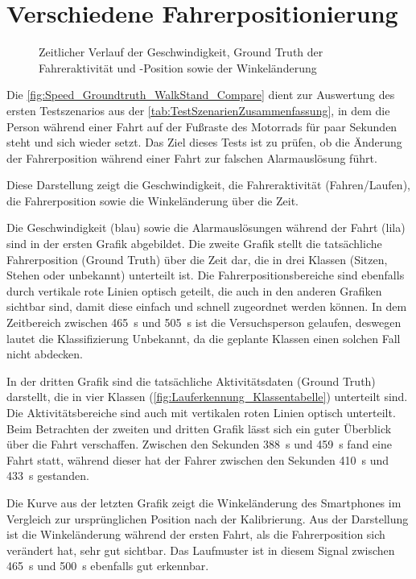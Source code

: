 \section{Verschiedene Fahrerpositionierung}
\begin{figure}[htpb]
	\centering
	\caption{Zeitlicher Verlauf der Geschwindigkeit, Ground Truth der Fahreraktivität und -Position sowie der Winkeländerung}
	\label{fig:Speed_Groundtruth_WalkStand_Compare}
\end{figure}
Die \autoref{fig:Speed_Groundtruth_WalkStand_Compare} dient zur Auswertung des ersten Testszenarios aus der \autoref{tab:TestSzenarienZusammenfassung}, in dem die Person während einer Fahrt auf der Fußraste des Motorrads für paar Sekunden steht und sich wieder setzt. Das Ziel dieses Tests ist zu prüfen, ob die Änderung der Fahrerposition während einer Fahrt zur falschen Alarmauslösung führt.

Diese Darstellung zeigt die Geschwindigkeit, die Fahreraktivität (Fahren/Laufen), die Fahrerposition sowie die Winkeländerung über die Zeit.

Die Geschwindigkeit (blau) sowie die Alarmauslösungen während der Fahrt (lila) sind in der ersten Grafik abgebildet.
Die zweite Grafik stellt die tatsächliche Fahrerposition (Ground Truth) über die Zeit dar, die in drei Klassen (Sitzen, Stehen oder unbekannt) unterteilt ist.
Die Fahrerpositionsbereiche sind ebenfalls durch vertikale rote Linien optisch geteilt, die auch in den anderen Grafiken sichtbar sind, damit diese einfach und schnell zugeordnet werden können.
In dem Zeitbereich zwischen \SI{465}{\second} und \SI{505}{\second} ist die Versuchsperson gelaufen, deswegen lautet die Klassifizierung \glqq Unbekannt\grqq{}, da die geplante Klassen einen solchen Fall nicht abdecken.

In der dritten Grafik sind die tatsächliche Aktivitätsdaten (Ground Truth) darstellt, die in vier Klassen (\autoref{fig:Lauferkennung_Klassentabelle}) unterteilt sind. Die Aktivitätsbereiche sind auch mit vertikalen roten Linien optisch unterteilt. Beim Betrachten der zweiten und dritten Grafik lässt sich ein guter Überblick über die Fahrt verschaffen. Zwischen den Sekunden \SI{388}{\second} und \SI{459}{\second} fand eine Fahrt statt, während dieser hat der Fahrer zwischen den Sekunden \SI{410}{\second} und \SI{433}{\second} gestanden.

Die Kurve aus der letzten Grafik zeigt die Winkeländerung des Smartphones im Vergleich zur ursprünglichen Position nach der Kalibrierung. Aus der Darstellung ist die Winkeländerung während der ersten Fahrt, als die Fahrerposition sich verändert hat, sehr gut sichtbar. Das Laufmuster ist in diesem Signal zwischen \SI{465}{\second} und \SI{500}{\second} ebenfalls gut erkennbar.

